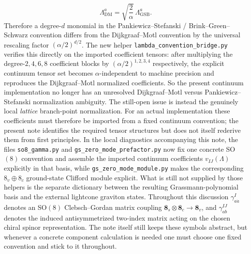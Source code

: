 \documentclass[11pt]{article}
\numberwithin{equation}{section}
\begin{document}
\begin{equation}
\label{eq:s14-021a}
\Lambda^a_{\mathrm{DM}}
=
\sqrt{\frac{2}{\alpha}}\,
\Lambda^a_{\mathrm{GSB}}.
\end{equation}
Therefore a degree-$d$ monomial in the Pankiewicz--Stefanski / Brink--Green--Schwarz convention differs from the Dijkgraaf--Motl convention by the universal rescaling factor $(\alpha/2)^{d/2}$. The new helper \texttt{lambda\_convention\_bridge.py} verifies this directly on the imported coefficient tensors: after multiplying the degree-$2,4,6,8$ coefficient blocks by $(\alpha/2)^{1,2,3,4}$ respectively, the explicit continuum tensor set becomes $\alpha$-independent to machine precision and reproduces the Dijkgraaf--Motl normalized coefficients. So the present continuum implementation no longer has an unresolved Dijkgraaf--Motl versus Pankiewicz--Stefanski normalization ambiguity. The still-open issue is instead the genuinely local \emph{lattice} branch-point normalization.
For an actual implementation these coefficients must therefore be imported from a fixed continuum convention; the present note identifies the required tensor structures but does not itself rederive them from first principles. In the local diagnostics accompanying this note, the files \texttt{so8\_gamma.py} and \texttt{gs\_zero\_mode\_prefactor.py} now fix one concrete SO$(8)$ convention and assemble the imported continuum coefficients $v_{IJ}(\Lambda)$ explicitly in that basis, while \texttt{gs\_zero\_mode\_module.py} makes the corresponding $8_v\oplus 8_c$ ground-state Clifford module explicit. What is still not supplied by those helpers is the separate dictionary between the resulting Grassmann-polynomial basis and the external lightcone graviton states.
Throughout this discussion $\gamma^I_{a\dot a}$ denotes an SO$(8)$ Clebsch--Gordan matrix coupling $\mathbf 8_s\otimes \mathbf 8_c\to \mathbf 8_v$, and $\gamma^{IJ}_{ab}$ denotes the induced antisymmetrized two-index matrix acting on the chosen chiral spinor representation. The note itself still keeps these symbols abstract, but whenever a concrete component calculation is needed one must choose one fixed convention and stick to it throughout.
\end{document}
